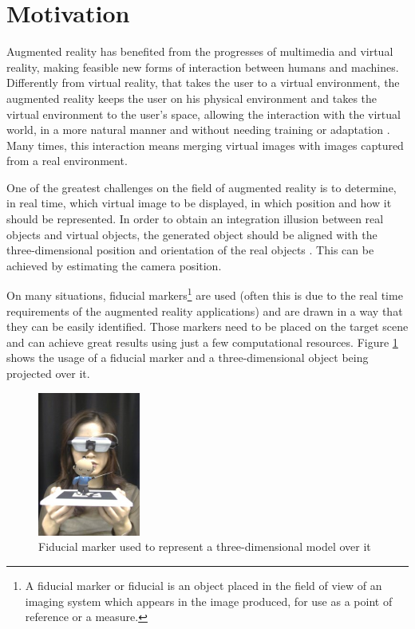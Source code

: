 \documentclass[msc, a4paper, classic, en]{ufbathesis}
\begin{document}
\tableofcontents
\listoffigures
\listoftables

\mainmatter

\section{Motivation}

Augmented reality has benefited from the progresses of multimedia and virtual reality, making feasible new forms of
interaction between humans and machines. Differently from virtual reality, that takes the user to a virtual environment, the augmented
reality keeps the user on his physical environment and takes the virtual environment to the user's space, allowing the interaction with
the virtual world, in a more natural manner and without needing training or adaptation \cite{tori2006fundamentos}. Many times, this interaction means
merging virtual images with images captured from a real environment.

One of the greatest challenges on the field of augmented reality is to determine, in real time, which virtual image to be displayed,
in which position and how it should be represented. In order to obtain an integration illusion between real objects and virtual objects,
the generated object should be aligned with the three-dimensional position and orientation of the real objects \cite{gallo11}. This can be achieved
by estimating the camera position.

On many situations, fiducial markers\footnote{A fiducial marker or fiducial is an object placed in the field of view of an imaging system which appears in the image produced, for use as a point of reference or a measure.} are used (often this is due to the real time requirements of the augmented reality applications) \cite{azuma} and are drawn in a way that they can be easily identified. Those markers need to be placed on the target scene and can achieve great results using just a few computational resources. Figure \ref{fig:fiducial_marker} shows the usage of a fiducial marker and a three-dimensional object being projected over it.

\begin{figure}
\centering
\includegraphics[width=0.3\textwidth]{images/fiducial_marker.png}
\caption{Fiducial marker used to represent a three-dimensional model over it \cite{artoolkit}}
\label{fig:fiducial_marker}
\end{figure}
\end{document}
